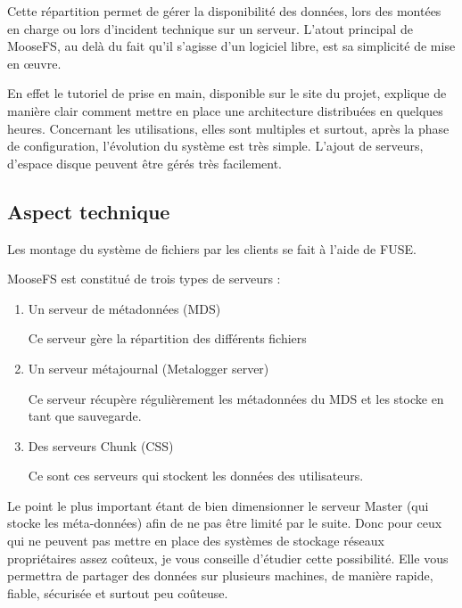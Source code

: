 \documentclass[12pt]{report}
\begin{document}
				Cette répartition permet de gérer la disponibilité des données,
				lors des montées en charge ou lors d’incident technique sur un serveur.
				L'atout principal de MooseFS, au delà du fait qu'il s’agisse d’un logiciel libre, est sa simplicité de mise en œuvre.
				
				En effet le tutoriel de prise en main, disponible sur le site du projet,
				explique de manière clair comment mettre en place une architecture distribuées en quelques heures.
				Concernant les utilisations, elles sont multiples et surtout, après la phase de configuration,
				l'évolution du système est très simple. L'ajout de serveurs, d’espace disque peuvent être gérés très facilement.

			\subsection{Aspect technique}
				
				Les montage du système de fichiers par les clients se fait à l'aide de FUSE. %

				MooseFS est constitué de trois types de serveurs :

				\begin{enumerate}
					\item Un serveur de métadonnées (MDS)

					Ce serveur gère la répartition des différents fichiers
					\item Un serveur métajournal (Metalogger server)

					Ce serveur récupère régulièrement les métadonnées du MDS et les stocke en tant que sauvegarde.
					\item Des serveurs Chunk (CSS) %

					Ce sont ces serveurs qui stockent les données des utilisateurs.
				\end{enumerate}
				
				Le point le plus important étant de bien dimensionner le serveur Master (qui stocke les méta-données)
				afin de ne pas être limité par le suite.
				Donc pour ceux qui ne peuvent pas mettre en place des systèmes de stockage réseaux propriétaires assez coûteux,
				je vous conseille d’étudier cette possibilité. Elle vous permettra de partager des données sur plusieurs machines,
				de manière rapide, fiable, sécurisée et surtout peu coûteuse.
\end{document}
